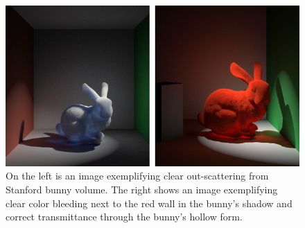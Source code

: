 \documentclass[runningheads]{llncs}
\begin{document}
\begin{figure}
    \centering
   \includegraphics[width=120mm]{img/Two_Bunnies.png}
    \caption{On the left is  an image exemplifying clear out-scattering from Stanford bunny volume.  The right shows an image exemplifying clear color bleeding next to the red wall in the bunny's shadow and correct transmittance through the bunny's hollow form.}
\end{figure}







\end{document}
